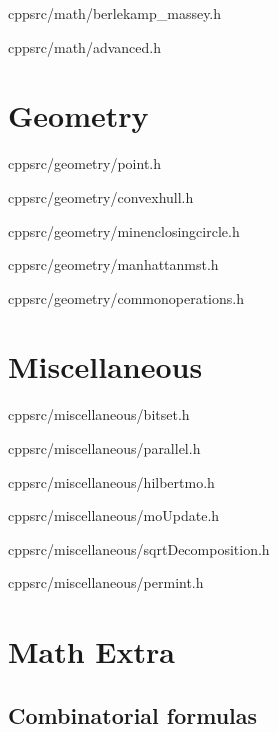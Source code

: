 \documentclass[portrait, 8pt, a4paper, oneside, twocolumn]{extarticle}
\begin{document}
    {}
    {}
    {cpp}{src/math/berlekamp_massey.h}
    \noindent\hrulefill

	{}
	{}
	{cpp}{src/math/advanced.h}
	\noindent\hrulefill
\section{Geometry}

    {}
    {}
    {cpp}{src/geometry/point.h}
    \noindent\hrulefill

    {}
    {}
    {cpp}{src/geometry/convexhull.h}
    \noindent\hrulefill

    {}
    {}
    {cpp}{src/geometry/minenclosingcircle.h}
    \noindent\hrulefill

    {}
    {}
    {cpp}{src/geometry/manhattanmst.h}
    \noindent\hrulefill

    {}
    {}
    {cpp}{src/geometry/commonoperations.h}
    \noindent\hrulefill

\section{Miscellaneous}
	{}
	{}
	{cpp}{src/miscellaneous/bitset.h}
	\noindent\hrulefill
    
	{}
	{}
	{cpp}{src/miscellaneous/parallel.h}
	\noindent\hrulefill
    
    {}
    {}
    {cpp}{src/miscellaneous/hilbertmo.h}
    \noindent\hrulefill

    {}
    {}
    {cpp}{src/miscellaneous/moUpdate.h}
    \noindent\hrulefill

    {}
    {}
    {cpp}{src/miscellaneous/sqrtDecomposition.h}
    \noindent\hrulefill

    {}
    {}
    {cpp}{src/miscellaneous/permint.h}
    \noindent\hrulefill

\section{Math Extra}
\subsection{Combinatorial formulas}
\end{document}

